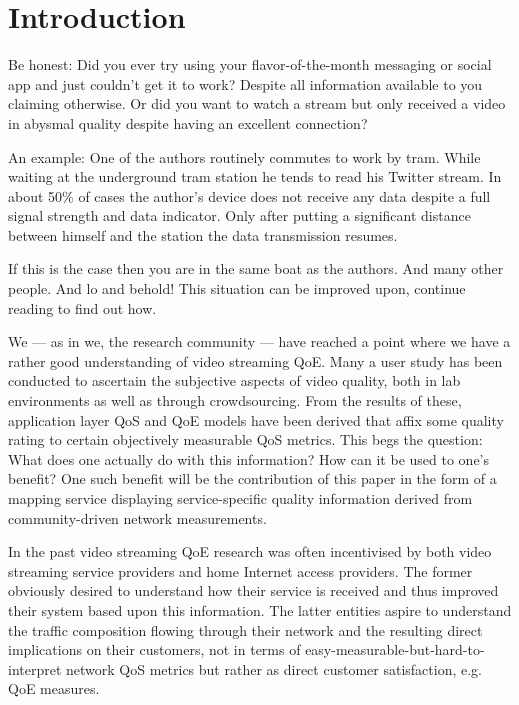 \section{Introduction}
\label{sec:introduction}

Be honest: Did you ever try using your flavor-of-the-month messaging or
social app and just couldn't get it to work? Despite all information
available to you claiming otherwise. Or did you want to watch a stream
but only received a video in abysmal quality despite having an excellent
connection?

An example: One of the authors routinely commutes to work by tram.
While waiting at the underground tram station he tends to read his
Twitter stream. In about 50\% of cases the author's device does not
receive any data despite a full signal strength and data indicator. Only
after putting a significant distance between himself and the station the
data transmission resumes.

If this is the case then you are in the same boat as the authors. And
many other people. And lo and behold! This situation can be improved
upon, continue reading to find out how.

We --- as in we, the research community --- have reached a point where we have a rather good understanding of video streaming \gls{QoE}. Many a user study has been conducted to ascertain the subjective aspects of video quality, both in lab environments as well as through crowdsourcing. From the results of these, application layer \gls{QoS} and \gls{QoE} models have been derived that affix some quality rating to certain objectively measurable \gls{QoS} metrics. This begs the question: What does one actually do with this information? How can it be used to one's benefit? One such benefit will be the contribution of this paper in the form of a mapping service displaying service-specific quality information derived from community-driven network measurements.

In the past video streaming \gls{QoE} research was often incentivised by both video streaming service providers and home Internet access providers. The former obviously desired to understand how their service is received and thus improved their system based upon this information. The latter entities aspire to understand the traffic composition flowing through their network and the resulting direct implications on their customers, not in terms of easy-measurable-but-hard-to-interpret network \gls{QoS} metrics but rather as direct customer satisfaction, e.g. \gls{QoE} measures.

